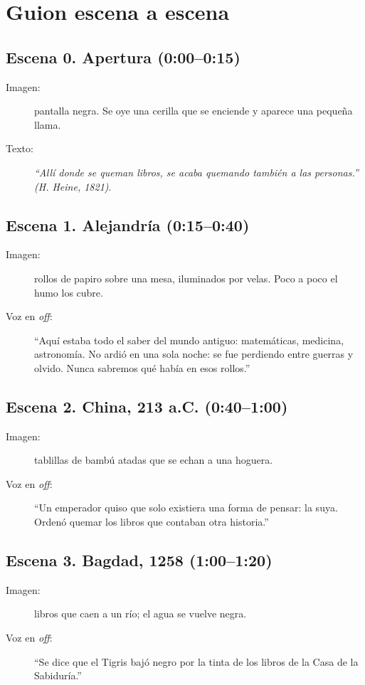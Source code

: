 \section{Guion escena a escena}

\subsection*{Escena 0. Apertura (0:00--0:15)}
\begin{description}
  \item[Imagen:] pantalla negra. Se oye una cerilla que se enciende y aparece una
        pequeña llama.
  \item[Texto:] \textit{``Allí donde se queman libros, se acaba quemando también
        a las personas.'' (H. Heine, 1821)}.
\end{description}

\subsection*{Escena 1. Alejandría (0:15--0:40)}
\begin{description}
  \item[Imagen:] rollos de papiro sobre una mesa, iluminados por velas. Poco a
        poco el humo los cubre.
  \item[Voz en \textit{off}:] ``Aquí estaba todo el saber del mundo antiguo:
        matemáticas, medicina, astronomía. No ardió en una sola noche: se fue
        perdiendo entre guerras y olvido. Nunca sabremos qué había en esos rollos.''
\end{description}

\subsection*{Escena 2. China, 213 a.C. (0:40--1:00)}
\begin{description}
  \item[Imagen:] tablillas de bambú atadas que se echan a una hoguera.
  \item[Voz en \textit{off}:] ``Un emperador quiso que solo existiera una forma
        de pensar: la suya. Ordenó quemar los libros que contaban otra historia.''
\end{description}

\subsection*{Escena 3. Bagdad, 1258 (1:00--1:20)}
\begin{description}
  \item[Imagen:] libros que caen a un río; el agua se vuelve negra.
  \item[Voz en \textit{off}:] ``Se dice que el Tigris bajó negro por la tinta de
        los libros de la Casa de la Sabiduría.''
\end{description}

